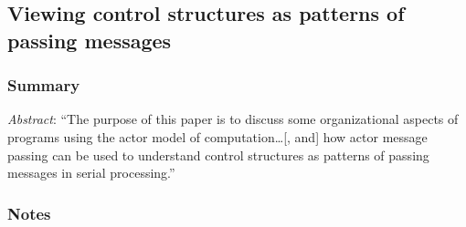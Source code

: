 \subsection{Viewing control structures as patterns of passing messages}


\subsubsection*{Summary}
\emph{Abstract}: ``The purpose of this paper is to discuss some organizational aspects of programs using the actor model of computation{\ldots}[, and] how actor message passing can be used to understand control structures as patterns of passing messages in serial processing.''

\subsubsection*{Notes}

